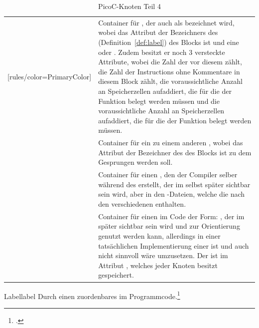 \begin{table}[H]
\begin{NiceTabular}{X[7]X[10]}[rules/color=PrimaryColor]
   & Container für , der auch als  bezeichnet wird, wobei das Attribut  der Bezeichners des  (Definition~\ref{def:label}) des Blocks ist und  eine  oder . Zudem besitzt er noch $3$ \textcolor{gray!90!black}{versteckte Attribute}, wobei   die Zahl der  vor diesem  zählt,   die Zahl der Instructions ohne Kommentare in diesem Block zählt,  die voraussichtliche Anzahl an Speicherzellen aufaddiert, die für die  der Funktion belegt werden müssen und  die voraussichtliche Anzahl an Speicherzellen aufaddiert, die für die  der Funktion belegt werden müssen. \\
   & Container für ein  zu einem anderen , wobei das Attribut  der Bezeichner des  des Blocks ist zu dem Gesprungen werden soll. \\
   & Container für einen , den der Compiler selber während des  erstellt, der im  selbst später  sichtbar sein wird, aber in den -Dateien, welche die  nach den verschiedenen  enthalten. \\
   & Container für einen  im Code der Form: , der im  später sichtbar sein wird und zur Orientierung genutzt werden kann, allerdings in einer tatsächlichen Implementierung einer   ist und auch nicht sinnvoll wäre umzusetzen. Der  ist im Attribut , welches jeder Knoten besitzt gespeichert. \\
  \bottomrule
\end{NiceTabular}
\caption{PicoC-Knoten Teil 4}
\label{tab:picoc_knoten_teil_4}
\end{table}


\begin{Definition}{Label}{label}
  Durch einen   zuordenbares  im Programmcode.\footcite{thiemann_compilerbau_2021}
\end{Definition}

